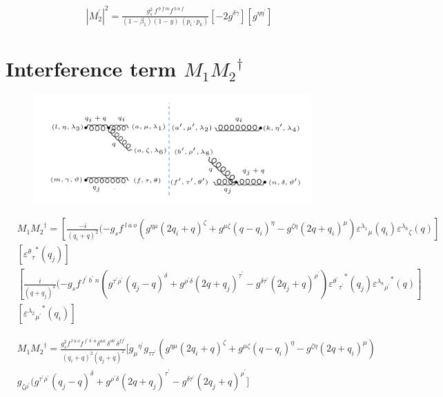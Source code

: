 \begin{equation}
\begin{split}
{|{M}^{\prime}_2|}^2 =\frac{g_s^2\: f^{\:b\:f\:m} f^{\:b\:n\:f}}{(1-\beta_1) (1-y)\:(p_i \cdot p_k)}[-2g^{{\delta}{\gamma}}][g^{{\eta}{{\eta}^{\prime}}}]
\end{split}
\end{equation}

\section{Interference term $M_1 {M_2}^{\dagger}$}
\begin{figure}[h!]
\centering
\includegraphics[width=0.95\textwidth]{images/GG/M1M2Dagger.png}
\end{figure}

\begin{equation}
\begin{split}
&M_1{M_2}^{\dagger}=[\frac{-i}{(q_i +q)^2}(-g_s f^{\:l\:a\:o}(g^{{\eta}{\mu}}(2q_i+q)^{\zeta}+g^{{\mu}{\zeta}}(q -q_i)^{\eta}-g^{{\zeta}{\eta}}(2q +q_i)^{\mu}){\varepsilon^{\lambda_1}}_{\mu} (q_i) {\varepsilon^{\lambda_6}}_{\zeta}(q)]\\
&[{{\varepsilon^{\theta}}_{{\tau}}}^* (q_j)]\\
&[\frac{i}{(q +q_j)^2}(-g_s f^{\:f^{\prime}\:b^{\prime}\:n }(g^{{{\tau}^{\prime}}{{\rho}^{\prime}}}(q_j-q)^{{\delta}}+g^{{{\rho}^{\prime}}{{\delta}}}(2q +q_j)^{{\tau}^{\prime}}-g^{{{\delta}}{{\tau}^{\prime}}}(2q_j+q)^{{\rho}^{\prime}}){{\varepsilon^{{\theta}^{\prime}}}_{{\tau}^{\prime}}}^* (q_j){{\varepsilon^{\lambda_8}}_{{\rho}^{\prime}}}^* (q)]\\
&[{{\varepsilon^{\lambda_2}}_{{\mu}^{\prime}}}^* (q_i)]
\end{split}
\end{equation}


\begin{equation}
\begin{split}
&M_1{M_2}^{\dagger}=\frac{g_s^2 f^{\:l\:a\:o} f^{\:f^{\prime}\: b^{\prime}\:n} \delta^{aa^{\prime}} \delta^{ob^{\prime}} \delta^{ff^{\prime}}}{(q_i +q)^2 (q_j +q)^2}
[{g_{{\mu}}}^{{\eta}^{\prime}} g_{{\tau}{{\tau}^{\prime}}}(g^{{\eta}{\mu}}(2q_i+q)^{\zeta}+g^{{\mu}{\zeta}}(q -q_i)^{\eta}-g^{{\zeta}{\eta}}(2q +q_i)^{\mu})\\
&g_{{{\zeta}}{{\rho}^{\prime}}}(g^{{{\tau}^{\prime}}{{\rho}^{\prime}}}(q_j-q)^{{\delta}}+g^{{{\rho}^{\prime}}{{\delta}}}(2q +q_j)^{{\tau}^{\prime}}-g^{{{\delta}}{{\tau}^{\prime}}}(2q_j+q)^{{\rho}^{\prime}}]
\end{split}
\end{equation}


